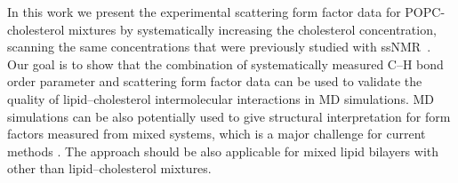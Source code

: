 \documentclass[aps,prl,superscriptaddress,twocolumn]{revtex4}
\begin{document}
In this work we present the experimental scattering form factor
data for POPC-cholesterol mixtures by systematically increasing the
cholesterol concentration, scanning the same concentrations that were previously studied with ssNMR~\cite{ferreira13}.
Our goal is to show that the combination
of systematically measured C--H bond order parameter and scattering form
factor data can be used to validate the quality of lipid--cholesterol
intermolecular interactions in MD simulations. MD simulations can be also
potentially used to give structural interpretation for form factors
measured from mixed systems, which is a major challenge for current methods \cite{pan12,Heftberger15,Marquardt15,??}. 
The approach should be also applicable for mixed lipid bilayers with
other than lipid--cholesterol mixtures.


\end{document}
